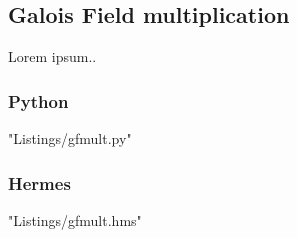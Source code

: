 \subsection{Galois Field multiplication}
Lorem ipsum..

\subsubsection{Python}
 {"Listings/gfmult.py"}

\subsubsection{Hermes}
 {"Listings/gfmult.hms"}
